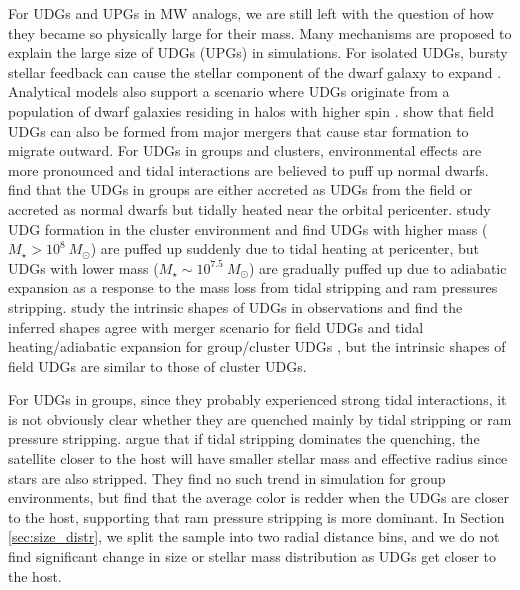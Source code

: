 \documentclass[twocolumn,astrosymb,twocolappendix]{aastex631}
\begin{document}
\begin{CJK*}{UTF8}{gbsn}
For UDGs and UPGs in MW analogs, we are still left with the question of how they became so physically large for their mass. Many mechanisms are proposed to explain the large size of UDGs (UPGs) in simulations. For isolated UDGs, bursty stellar feedback can cause the stellar component of the dwarf galaxy to expand \citep[e.g.,][]{DiCintio2017,Chan2018,Martin2019,Jiang2019,Carleton2019}. Analytical models also support a scenario where UDGs originate from a population of dwarf galaxies residing in halos with higher spin \citep{Dalcanton1997,Amorisco2016,Rong2017,Liao2019}. \citet{Wright2021} show that field UDGs can also be formed from major mergers that cause star formation to migrate outward. 
For UDGs in groups and clusters, environmental effects are more pronounced and tidal interactions are believed to puff up normal dwarfs. \citet{Jiang2019} find that the UDGs in groups are either accreted as UDGs from the field or accreted as normal dwarfs but tidally heated near the orbital pericenter. \citet{Tremmel2020} study UDG formation in the cluster environment and find UDGs with higher mass ($M_\star > 10^{8}\ M_\odot$) are puffed up suddenly due to tidal heating at pericenter, but UDGs with lower mass ($M_\star \sim 10^{7.5}\ M_\odot$) are gradually puffed up due to adiabatic expansion as a response to the mass loss from tidal stripping and ram pressures stripping. \citet{Kado-Fong2021} study the intrinsic shapes of UDGs in observations and find the inferred shapes agree with merger scenario for field UDGs \citep{Wright2021} and tidal heating/adiabatic expansion for group/cluster UDGs \citep{Jiang2019,Tremmel2020}, but the intrinsic shapes of field UDGs are similar to those of cluster UDGs. 


For UDGs in groups, since they probably experienced strong tidal interactions, it is not obviously clear whether they are quenched mainly by tidal stripping or ram pressure stripping. 
\citet{Jiang2019} argue that if tidal stripping dominates the quenching, the satellite closer to the host will have smaller stellar mass and effective radius since stars are also stripped. They find no such trend in simulation for group environments, but find that the average color is redder when the UDGs are closer to the host, supporting that ram pressure stripping is more dominant. In Section \ref{sec:size_distr}, we split the sample into two radial distance bins, and we do not find significant change in size or stellar mass distribution as UDGs get closer to the host. 


\end{CJK*}
\end{document}
